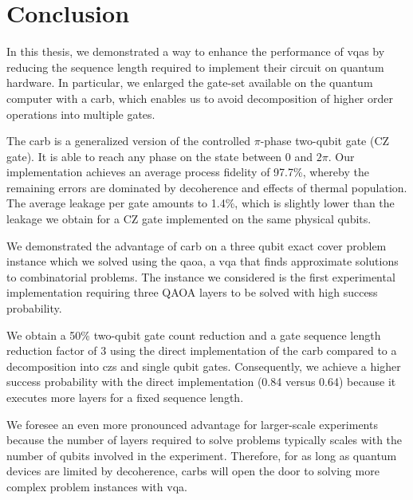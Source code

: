 \chapter{Conclusion}
\glsresetall{}



In  this  thesis,  we  demonstrated  a  way  to  enhance  the  performance  of \glspl{vqa} by reducing the  sequence length  required  to implement their circuit on quantum hardware. In particular, we enlarged the gate-set available on the quantum computer with a \gls{carb}, which enables us to avoid decomposition of higher order operations into multiple gates. 

The \gls{carb} is a generalized version of the controlled $\pi$-phase two-qubit gate (CZ gate). It is able to reach any phase on the \oo{} state between 0 and $2\pi$. Our implementation achieves an average process fidelity of 97.7\%, whereby the remaining errors are dominated by decoherence and effects of thermal population. The average leakage per gate amounts to 1.4\%, which is slightly lower than the leakage we obtain for a CZ gate implemented on the same physical qubits.

We demonstrated the advantage of \gls{carb} on a three qubit exact cover problem instance which we solved using the \gls{qaoa}, a \gls{vqa} that finds approximate solutions to combinatorial problems.  The instance we considered is the first experimental implementation requiring three QAOA layers to be solved with high success probability. 

We obtain a 50\% two-qubit gate count reduction and a gate sequence length reduction factor of 3 using the direct implementation of the \gls{carb} compared to a decomposition into \glspl{cz} and single qubit gates. Consequently, we achieve a higher success probability with the direct implementation (0.84 versus 0.64) because it executes more layers for a fixed sequence length. 

We foresee an even more pronounced advantage for larger-scale experiments because the number of layers required to solve problems typically scales with the number of qubits involved in the experiment. Therefore, for as long as quantum devices are limited by decoherence, \glspl{carb} will open the door to solving more complex problem instances with \gls{vqa}.
